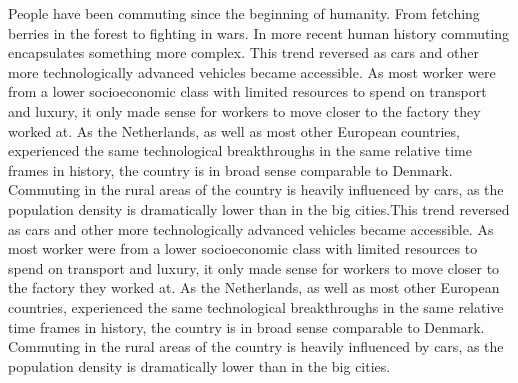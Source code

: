 People have been commuting since the beginning of humanity.
From fetching berries in the forest to fighting in wars.
In more recent human history commuting encapsulates something more complex.
This trend reversed as cars and other more technologically advanced vehicles became accessible.
As most worker were from a lower socioeconomic class with limited resources to spend on transport and luxury, it only made sense for workers to move closer to the factory they worked at.
As the Netherlands, as well as most other European countries, experienced the same technological breakthroughs in the same relative time frames in history, the country is in broad sense comparable to Denmark.
Commuting in the rural areas of the country is heavily influenced by cars, as the population density is dramatically lower than in the big cities.This trend reversed as cars and other more technologically advanced vehicles became accessible.
As most worker were from a lower socioeconomic class with limited resources to spend on transport and luxury, it only made sense for workers to move closer to the factory they worked at.
As the Netherlands, as well as most other European countries, experienced the same technological breakthroughs in the same relative time frames in history, the country is in broad sense comparable to Denmark.
Commuting in the rural areas of the country is heavily influenced by cars, as the population density is dramatically lower than in the big cities.
